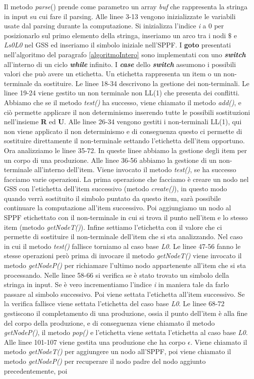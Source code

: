 Il metodo \textit{parse}() prende come parametro un array \textit{buf} che rappresenta la stringa in input su cui fare il parsing. Alle linee 3-13 vengono inizializzate le variabili usate dal parsing durante la computazione. Si inizializza l'indice \textit{i} a 0 per posizionarlo sul primo elemento della stringa, inseriamo un arco tra i nodi $\$$ e \textit{Ls0L0} nel GSS ed inseriamo il simbolo iniziale nell'SPPF. I \textbf{goto} presentati nell'algoritmo del paragrafo \ref{algoritmoIntero} sono implementati con uno \textbf{\textit{switch }}all'interno di un ciclo \textbf{\textit{while}} infinito. I \textbf{\textit{case}} dello \textbf{\textit{switch}} assumono i possibili valori che può avere un etichetta. Un etichetta rappresenta un item o un non-terminale da sostituire. Le linee 18-34 descrivono la gestione dei non-terminali. Le linee 19-24 viene gestito un non terminale non LL(1) che presenta dei conflitti. Abbiamo che se il metodo \textit{test()} ha successo, viene chiamato il metodo \textit{add()}, e ciò permette applicare il non determinismo inserendo tutte le possibili sostituzioni nell'insieme \textbf{R} ed \textbf{U}. Alle linee 26-34 vengono gestiti i non-terminali LL(1), qui non viene applicato il non determinismo e di conseguenza questo ci permette di sostituire direttamente il non-terminale settando l'etichetta dell'item opportuno. Ora analizziamo le linee 35-72. In queste linee abbiamo la gestione degli item per un corpo di una produzione. Alle linee 36-56 abbiamo la gestione di un non-terminale all'interno dell'item. Viene invocato il metodo \textit{test()}, se ha successo facciamo varie operazioni. La prima operazione che facciamo è creare un nodo nel GSS con l'etichetta dell'item successivo (metodo \textit{create()}), in questo modo quando verrà sostituito il simbolo puntato da questo item, sarà possibile continuare la computazione all'item successivo. Poi aggiungiamo un nodo al SPPF etichettato con il non-terminale in cui si trova il punto nell'item e lo stesso item (metodo \textit{getNodeT()}). Infine settiamo l'etichetta con il valore che ci permette di sostituire il non-terminale dell'item che si sta analizzando. Nel caso in cui il metodo \textit{test()} fallisce torniamo al caso base \textit{L0}. Le linee 47-56 fanno le stesse operazioni però prima di invocare il metodo \textit{getNodeT()} viene invocato il metodo \textit{getNodeP()} per richiamare l'ultimo nodo appartenente all'item che si sta processando. Nelle linee 58-66 si verifica se è stato trovato un simbolo della stringa in input. Se è vero incrementiamo l'indice \textit{i} in maniera tale da farlo passare al simbolo successivo. Poi viene settata l'etichetta all'item successivo. Se la verifica fallisce viene settata l'etichetta del caso base \textit{L0}. Le linee 68-72 gestiscono il completamento di una produzione, ossia il punto dell'item è alla fine del corpo della produzione, e di conseguenza viene chiamato il metodo \textit{getNodeP()}, il metodo \textit{pop()} e l'etichetta viene settata l'etichetta al caso base \textit{L0}. Alle linee 101-107 viene gestita una produzione che ha corpo $\epsilon$. Viene chiamato il metodo \textit{getNodeT()} per aggiungere un nodo all'SPPF, poi viene chiamato il metodo \textit{getNodeP()} per recuperare il nodo padre del nodo aggiunto precedentemente, poi 